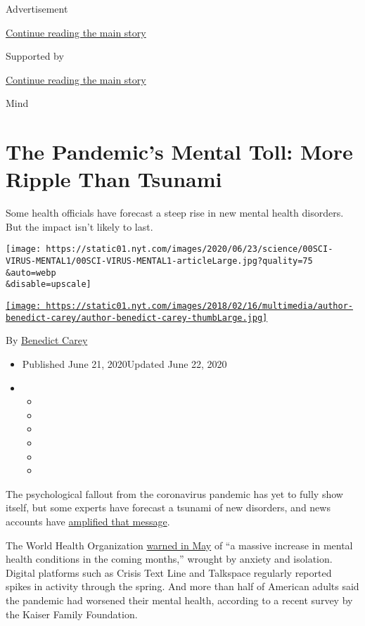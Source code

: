 Advertisement

\protect\hyperlink{after-top}{Continue reading the main story}

Supported by

\protect\hyperlink{after-sponsor}{Continue reading the main story}

Mind

\hypertarget{the-pandemics-mental-toll-more-ripple-than-tsunami}{%
\section{The Pandemic's Mental Toll: More Ripple Than
Tsunami}\label{the-pandemics-mental-toll-more-ripple-than-tsunami}}

Some health officials have forecast a steep rise in new mental health
disorders. But the impact isn't likely to last.

\texttt{[image: https://static01.nyt.com/images/2020/06/23/science/00SCI-VIRUS-MENTAL1/00SCI-VIRUS-MENTAL1-articleLarge.jpg?quality=75\\\&auto=webp\\\&disable=upscale]}

\href{https://www.nytimes.com/by/benedict-carey}{\texttt{[image: https://static01.nyt.com/images/2018/02/16/multimedia/author-benedict-carey/author-benedict-carey-thumbLarge.jpg]}}

By \href{https://www.nytimes.com/by/benedict-carey}{Benedict Carey}

\begin{itemize}
\item
  Published June 21, 2020Updated June 22, 2020
\item
  \begin{itemize}
  \item
  \item
  \item
  \item
  \item
  \item
  \end{itemize}
\end{itemize}

The psychological fallout from the coronavirus pandemic has yet to fully
show itself, but some experts have forecast a tsunami of new disorders,
and news accounts have
\href{https://www.washingtonpost.com/health/2020/05/04/mental-health-coronavirus}{amplified
that message}.

The World Health Organization
\href{https://www.who.int/news-room/detail/14-05-2020-substantial-investment-needed-to-avert-mental-health-crisis}{warned
in May} of ``a massive increase in mental health conditions in the
coming months,'' wrought by anxiety and isolation. Digital platforms
such as Crisis Text Line and Talkspace regularly reported spikes in
activity through the spring. And more than half of American adults said
the pandemic had worsened their mental health, according to a recent
survey by the Kaiser Family Foundation.

